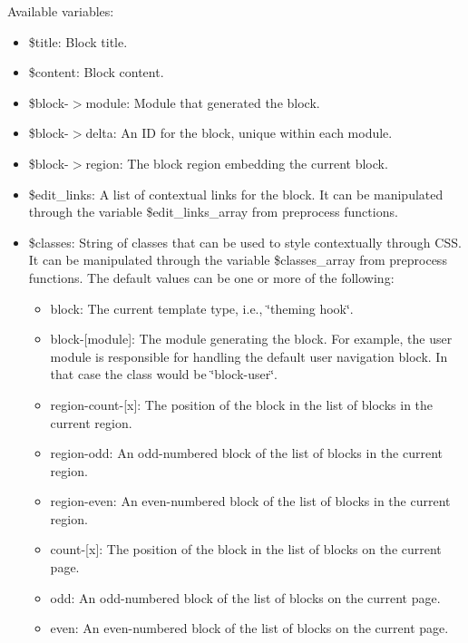 Available variables:\begin{itemize}
\item \$title: Block title.\item \$content: Block content.\item \$block-$>$module: Module that generated the block.\item \$block-$>$delta: An ID for the block, unique within each module.\item \$block-$>$region: The block region embedding the current block.\item \$edit\_\-links: A list of contextual links for the block. It can be manipulated through the variable \$edit\_\-links\_\-array from preprocess functions.\item \$classes: String of classes that can be used to style contextually through CSS. It can be manipulated through the variable \$classes\_\-array from preprocess functions. The default values can be one or more of the following:\begin{itemize}
\item block: The current template type, i.e., \char`\"{}theming hook\char`\"{}.\item block-\mbox{[}module\mbox{]}: The module generating the block. For example, the user module is responsible for handling the default user navigation block. In that case the class would be \char`\"{}block-user\char`\"{}.\item region-count-\mbox{[}x\mbox{]}: The position of the block in the list of blocks in the current region.\item region-odd: An odd-numbered block of the list of blocks in the current region.\item region-even: An even-numbered block of the list of blocks in the current region.\item count-\mbox{[}x\mbox{]}: The position of the block in the list of blocks on the current page.\item odd: An odd-numbered block of the list of blocks on the current page.\item even: An even-numbered block of the list of blocks on the current page.\end{itemize}
\end{itemize}


